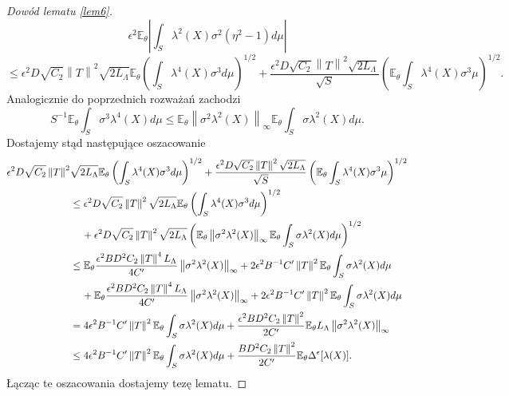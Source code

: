\documentclass[man,mfiu]{mgrwms}
\newcommand{\norm}[1]{\left\lVert#1\right\rVert}
\begin{document}
\begin{proof}[Dowód lematu \ref{lem6}]
\begin{displaymath}
\epsilon^2\mathbb{E}_{\theta}\left|\int_S\lambda^2(X)\sigma^2(\eta^2-1)d\mu\right|
\end{displaymath}
\begin{displaymath}
\leq \epsilon^2D\sqrt{C_2}\norm{T}^2\sqrt{2L_{\Lambda}}\mathbb{E}_{\theta}\left(\int_S\lambda^4(X)\sigma^3d\mu\right)^{1/2}+\frac{\epsilon^2D\sqrt{C_2}\norm{T}^2\sqrt{2L_{\Lambda}}}{\sqrt{S}}\left(\mathbb{E}_{\theta}\int_S\lambda^4(X)\sigma^3\mu\right)^{1/2}.
\end{displaymath}
Analogicznie do poprzednich rozważań zachodzi
\begin{displaymath}
S^{-1}\mathbb{E}_{\theta}\int_S\sigma^3\lambda^4(X)d\mu\leq 
\mathbb{E}_{\theta}\norm{\sigma^2\lambda^2(X)}_{\infty}\mathbb{E}_{\theta}\int_S\sigma\lambda^2(X)d\mu.
\end{displaymath}
Dostajemy stąd następujące oszacowanie
\begin{displaymath}
\begin{split}
\epsilon^2D\sqrt{C_2}\norm{T}^2&\sqrt{2L_{\Lambda}}\mathbb{E}_{\theta}\left(\int_S\lambda^4(X)\sigma^3d\mu\right)^{1/2}+\frac{\epsilon^2D\sqrt{C_2}\norm{T}^2\sqrt{2L_{\Lambda}}}{\sqrt{S}}\left(\mathbb{E}_{\theta}\int_S\lambda^4(X)\sigma^3\mu\right)^{1/2} \\
&\leq \epsilon^2D\sqrt{C_2}\norm{T}^2\sqrt{2L_{\Lambda}}\mathbb{E}_{\theta}\left(\int_S\lambda^4(X)\sigma^3d\mu\right)^{1/2}\\
&\hspace{4mm}+\epsilon^2D\sqrt{C_2}\norm{T}^2\sqrt{2L_{\Lambda}}\left(\mathbb{E}_{\theta}\norm{\sigma^2\lambda^2(X)}_{\infty}\mathbb{E}_{\theta}\int_S\sigma\lambda^2(X)d\mu\right)^{1/2}\\
&\leq \mathbb{E}_{\theta}\frac{\epsilon^2BD^2C_2\norm{T}^4L_{\Lambda}}{4C'}\norm{\sigma^2\lambda^2(X)}_{\infty}+2\epsilon^2B^{-1}C'\norm{T}^2\mathbb{E}_{\theta}\int_S\sigma\lambda^2(X)d\mu\\
&\hspace{4mm}+\mathbb{E}_{\theta}\frac{\epsilon^2BD^2C_2\norm{T}^4L_{\Lambda}}{4C'}\norm{\sigma^2\lambda^2(X)}_{\infty}+2\epsilon^2B^{-1}C'\norm{T}^2\mathbb{E}_{\theta}\int_S\sigma\lambda^2(X)d\mu\\
&=4\epsilon^2B^{-1}C'\norm{T}^2\mathbb{E}_{\theta}\int_S\sigma\lambda^2(X)d\mu+\frac{\epsilon^2BD^2C_2\norm{T}^2}{2C'}\mathbb{E}_{\theta}L_{\Lambda}\norm{\sigma^2\lambda^2(X)}_{\infty}\\
&\leq 4\epsilon^2B^{-1}C'\norm{T}^2\mathbb{E}_{\theta}\int_S\sigma\lambda^2(X)d\mu+\frac{BD^2C_2\norm{T}^2}{2C'}\mathbb{E}_{\theta}\Delta^{\epsilon}[\lambda(X)].
\end{split}
\end{displaymath}
Łącząc te oszacowania dostajemy tezę lematu.
\end{proof}
\end{document}

